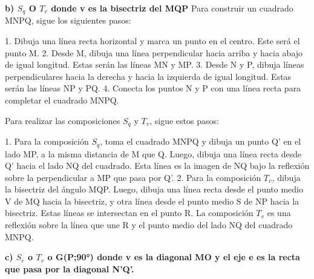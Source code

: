 \documentclass{article}
\begin{document}
{\bf b) $S_q$ O $T_v$ donde v es la bisectriz del MQP}
Para construir un cuadrado MNPQ, sigue los siguientes pasos:

1. Dibuja una línea recta horizontal y marca un punto en el centro. Este será el punto M.
2. Desde M, dibuja una línea perpendicular hacia arriba y hacia abajo de igual longitud. Estas serán las líneas MN y MP.
3. Desde N y P, dibuja líneas perpendiculares hacia la derecha y hacia la izquierda de igual longitud. Estas serán las líneas NP y PQ.
4. Conecta los puntos N y P con una línea recta para completar el cuadrado MNPQ.

Para realizar las composiciones $S_q$ y $T_v$, sigue estos pasos:

1. Para la composición $S_q$, toma el cuadrado MNPQ y dibuja un punto Q' en el lado MP, a la misma distancia de M que Q. Luego, dibuja una línea recta desde Q' hacia el lado NQ del cuadrado. Esta línea es la imagen de NQ bajo la reflexión sobre la perpendicular a MP que pasa por Q'.
2. Para la composición $T_v$, dibuja la bisectriz del ángulo MQP. Luego, dibuja una línea recta desde el punto medio V de MQ hacia la bisectriz, y otra línea desde el punto medio S de NP hacia la bisectriz. Estas líneas se intersectan en el punto R. La composición $T_v$ es una reflexión sobre la línea que une R y el punto medio del lado NQ del cuadrado MNPQ.


{\bf c) $S_e$ o $T_v$ o G(P;90°) donde v es la diagonal MO y el eje e es la recta que pasa por la diagonal N’Q’.}
\end{document}
